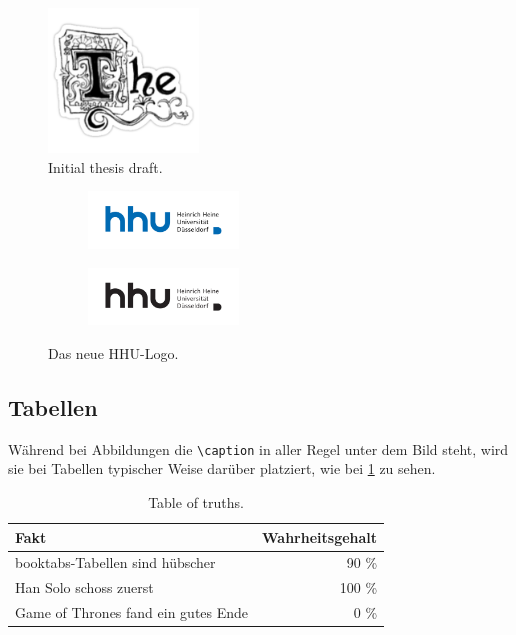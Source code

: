 \begin{figure}[h]
  \centering
  \includegraphics[width=4cm]{fig/the.png}
  \caption{Initial thesis draft.}%
  \label{fig:initial-draft}
\end{figure}

\begin{figure}[h]
  \begin{subfigure}{.5\textwidth}
    \centering
    \includegraphics[width=4cm]{fig/hhu-logo-rgb.pdf}
    \label{fig:hhu-rgb}
  \end{subfigure}%
  \begin{subfigure}{.5\textwidth}
    \centering
    \includegraphics[width=4cm]{fig/hhu-logo-black.pdf}
    \label{fig:hhu-bw}
  \end{subfigure}%
  \caption{Das neue HHU-Logo.}%
  \label{fig:hhu-logo}
\end{figure}


\subsection{Tabellen}%
\label{sec:tables}

Während bei Abbildungen die \texttt{\textbackslash{}caption}
in aller Regel unter dem Bild steht,
wird sie bei Tabellen typischer Weise darüber platziert, wie bei
\cref{table:truths} zu sehen.

\begin{table}[ht]
  \begin{center}
    \caption{Table of truths.}%
    \label{table:truths}
    \begin{tabular}{lr}
      \toprule
      Fakt                                & Wahrheitsgehalt \\
      \midrule
      booktabs-Tabellen sind hübscher     & 90 \%           \\
      Han Solo schoss zuerst              & 100 \%          \\
      Game of Thrones fand ein gutes Ende & 0 \%            \\
      \bottomrule
    \end{tabular}
  \end{center}
\end{table}

